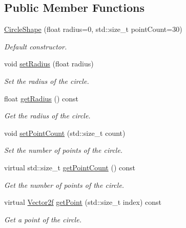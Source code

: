 \subsection*{Public Member Functions}
\begin{DoxyCompactItemize}
\item 
\mbox{\hyperlink{classsf_1_1_circle_shape_aaebe705e7180cd55588eb19488af3af1}{Circle\+Shape}} (float radius=0, std\+::size\+\_\+t point\+Count=30)
\begin{DoxyCompactList}\small\item\em Default constructor. \end{DoxyCompactList}\item 
void \mbox{\hyperlink{classsf_1_1_circle_shape_a21cdf85fc2f201e10222a241af864be0}{set\+Radius}} (float radius)
\begin{DoxyCompactList}\small\item\em Set the radius of the circle. \end{DoxyCompactList}\item 
float \mbox{\hyperlink{classsf_1_1_circle_shape_aa3dd5a1b5031486ce5b6f09d43674aa3}{get\+Radius}} () const
\begin{DoxyCompactList}\small\item\em Get the radius of the circle. \end{DoxyCompactList}\item 
void \mbox{\hyperlink{classsf_1_1_circle_shape_a16590ee7bdf5c9f752275468a4997bed}{set\+Point\+Count}} (std\+::size\+\_\+t count)
\begin{DoxyCompactList}\small\item\em Set the number of points of the circle. \end{DoxyCompactList}\item 
virtual std\+::size\+\_\+t \mbox{\hyperlink{classsf_1_1_circle_shape_a014d29ec11e8afa4dce50e7047d99601}{get\+Point\+Count}} () const
\begin{DoxyCompactList}\small\item\em Get the number of points of the circle. \end{DoxyCompactList}\item 
virtual \mbox{\hyperlink{classsf_1_1_vector2}{Vector2f}} \mbox{\hyperlink{classsf_1_1_circle_shape_a2d7f9715502b960b92387102fddb8736}{get\+Point}} (std\+::size\+\_\+t index) const
\begin{DoxyCompactList}\small\item\em Get a point of the circle. \end{DoxyCompactList}\end{DoxyCompactItemize}
